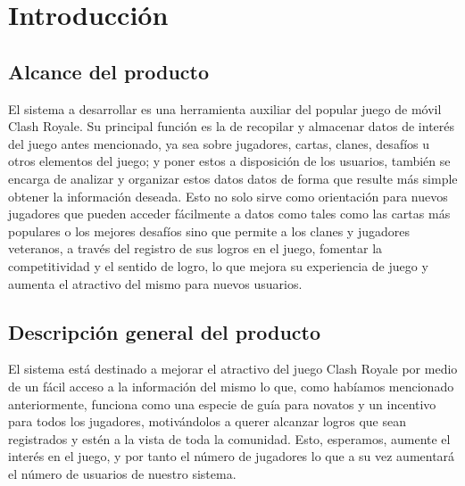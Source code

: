 %
%
%
%
\section{Introducción}

\subsection{Alcance del producto}

El sistema a desarrollar es una herramienta auxiliar del popular juego de móvil Clash Royale. Su principal función es la de recopilar y almacenar datos de interés del juego antes mencionado, ya sea sobre jugadores, cartas, clanes, desafíos u otros elementos del juego; y poner estos a disposición de los usuarios, también se encarga de analizar y organizar estos datos datos de forma que resulte más simple obtener la información deseada. Esto no solo sirve como orientación para nuevos jugadores que pueden acceder fácilmente a datos como tales como las cartas más populares o los mejores desafíos sino que permite a los clanes y jugadores veteranos, a través del registro de sus logros en el juego, fomentar la competitividad y el sentido de logro, lo que mejora su experiencia de juego y aumenta el atractivo del mismo para nuevos usuarios.

\subsection{Descripción general del producto}

El sistema está destinado a mejorar el atractivo del juego Clash Royale por medio de un fácil acceso a la información del mismo lo que, como habíamos mencionado anteriormente, funciona como una especie de guía para novatos y un incentivo para todos los jugadores, motivándolos a querer alcanzar logros que sean registrados y estén a la vista de toda la comunidad. Esto, esperamos, aumente el interés en  el juego, y por tanto el número de jugadores lo que a su vez aumentará el número de usuarios de nuestro sistema. 

